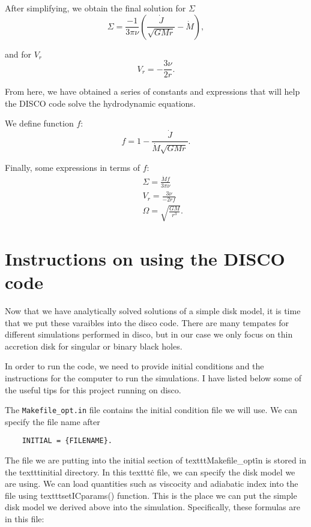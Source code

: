 \documentclass{article}
\begin{document}
After simplifying, we obtain the final solution for $\Sigma$
\begin{equation}
    \Sigma = \frac{-1}{3\pi \nu} \left(\frac{\dot J}{\sqrt{GMr}} - \dot M\right),
\end{equation}

and for $V_r$ 
\begin{equation}
    V_r = -\frac{3\nu}{2r}.
\end{equation}

From here, we have obtained a series of constants and expressions that will help the DISCO code solve the hydrodynamic equations.

We define function $f$:
\begin{equation}
    f = 1 - \frac{\dot J}{ \dot M \sqrt{GMr}}.
\end{equation}

Finally, some expressions in terms of $f$:
\begin{eqnarray}
    && \Sigma = \frac{\dot M f }{ 3 \pi \nu} \nonumber \\
    && V_r = \frac{3\nu}{-2rf} \nonumber \\
    && \Omega = \sqrt{\frac{GM}{r^3}}.
\end{eqnarray}


\section{Instructions on using the DISCO code}

Now that we have analytically solved solutions of a simple disk model, it is time that we put these varaibles into the 
disco code. There are many tempates for different simulations performed in disco, but in our case we only focus on
thin accretion disk for singular or binary black holes. 

In order to run the code, we need to provide initial conditions and the instructions for the computer to run the simulations.
I have listed below some of the useful tips for this project running on disco.

The \texttt{Makefile\_opt.in} file contains the initial condition file we will use. We can specify the file name after

\begin{verbatim}
    INITIAL = {FILENAME}.
\end{verbatim}

The file we are putting into the initial section of texttt{Makefile\_opt\.in} is stored in the texttt{initial} directory. 
In this texttt{\.c} file, we can specify the disk model we are using. We can load quantities such as viscocity and adiabatic index into the file using
texttt{setICparams()} function. This is the place we can put the simple disk model we derived above into the simulation.
Specifically, these formulas are in this file:
\end{document}
